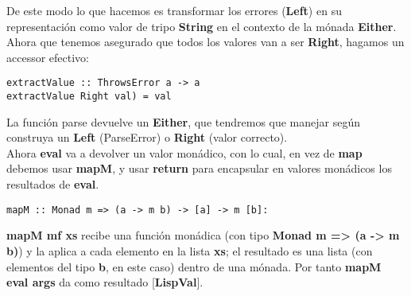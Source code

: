 De este modo lo que hacemos es transformar los errores (\textbf{Left}) en su representaci\'on como valor de tripo \textbf{String} en el contexto de la m\'onada \textbf{Either}.\\

Ahora que tenemos asegurado que todos los valores van a ser \textbf{Right}, hagamos un accessor
efectivo:\\

\begin{minipage}{\linewidth}
\begin{small}
\begin{lstlisting}[frame=single]
extractValue :: ThrowsError a -> a
extractValue Right val) = val
\end{lstlisting}
\end{small}
\end{minipage}

La funci\'on parse devuelve un \textbf{Either}, que tendremos que manejar seg\'un construya un \textbf{Left} (ParseError) o \textbf{Right} (valor correcto).\\

Ahora \textbf{eval} va a devolver un valor mon\'adico, con lo cual, en vez de \textbf{map} debemos usar \textbf{mapM}, y usar \textbf{return} para encapsular en valores mon\'adicos los resultados de \textbf{eval}.\\

\begin{minipage}{\linewidth}
\begin{small}
\begin{lstlisting}[frame=single]
mapM :: Monad m => (a -> m b) -> [a] -> m [b]:
\end{lstlisting}
\end{small}
\end{minipage}

\textbf{mapM mf xs} recibe una funci\'on mon\'adica (con tipo \textbf{Monad m => (a -> m b)}) y la aplica a cada elemento en la lista \textbf{xs}; el resultado es una lista (con elementos del tipo \textbf{b}, en este caso) dentro de una m\'onada. Por tanto \textbf{mapM eval args} da como resultado [\textbf{LispVal}].\\

